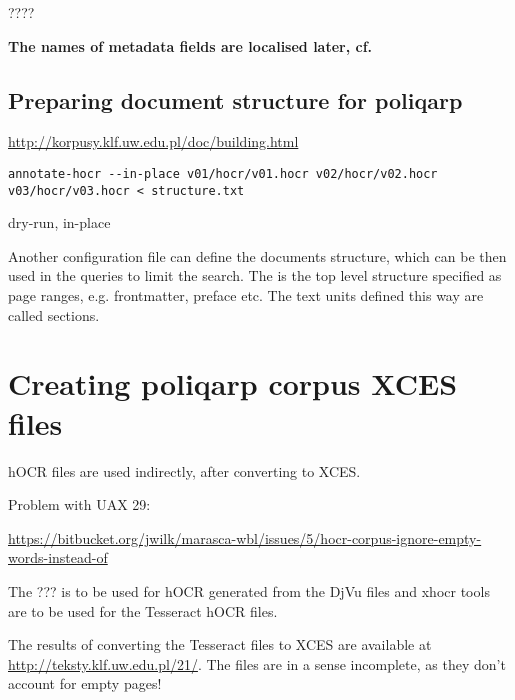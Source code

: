 \documentclass{article}
\begin{document}
????



\textbf{The names of metadata fields are localised later, cf.}


\subsection{Preparing document structure for poliqarp}
\label{sec:prep-docum-struct}

\url{http://korpusy.klf.uw.edu.pl/doc/building.html}

\begin{verbatim}
annotate-hocr --in-place v01/hocr/v01.hocr v02/hocr/v02.hocr v03/hocr/v03.hocr < structure.txt
\end{verbatim}

dry-run, in-place

Another configuration file can define the documents structure, which
can be then used in the queries to limit the search. The is the top
level structure specified as page ranges, e.g. frontmatter, preface
etc.  The text units defined this way are called sections.




\section{Creating poliqarp corpus XCES files}
\label{sec:creat-poliq-corp-2}



hOCR files are used indirectly, after converting to XCES.

Problem with UAX 29:

\url{https://bitbucket.org/jwilk/marasca-wbl/issues/5/hocr-corpus-ignore-empty-words-instead-of}


The ??? is to be used for hOCR generated from the DjVu files and xhocr
tools are to be used for the Tesseract hOCR files. 

The results of converting the Tesseract files to XCES are available at
\url{http://teksty.klf.uw.edu.pl/21/}. The files are in a sense
incomplete, as they don't account for empty pages!
\end{document}
